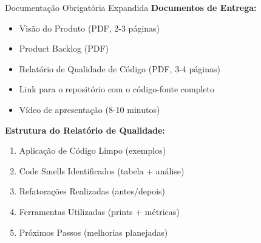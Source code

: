 \documentclass[10pt]{beamer}
\begin{document}
\begin{frame}{Documentação Obrigatória Expandida}
\textbf{Documentos de Entrega:}
\begin{itemize}
    \item[\checkmark] Visão do Produto (PDF, 2-3 páginas)
    \item[\checkmark] Product Backlog (PDF)
    \item[\checkmark] Relatório de Qualidade de Código (PDF, 3-4 páginas)
    \item[\checkmark] Link para o repositório com o código-fonte completo
    \item[\checkmark] Vídeo de apresentação (8-10 minutos)
\end{itemize}

\vspace{0.3cm}
\textbf{Estrutura do Relatório de Qualidade:}
\begin{enumerate}
    \item Aplicação de Código Limpo (exemplos)
    \item Code Smells Identificados (tabela + análise)  
    \item Refatorações Realizadas (antes/depois)
    \item Ferramentas Utilizadas (prints + métricas)
    \item Próximos Passos (melhorias planejadas)
\end{enumerate}
\end{frame}
\end{document}
